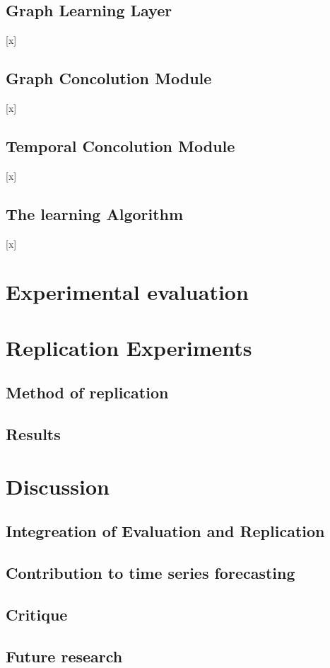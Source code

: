 \documentclass[letterpaper,twocolumn,11pt]{article}
\begin{document}
\subsection{Graph Learning Layer}
[x]
\subsection{Graph Concolution Module}
[x]
\subsection{Temporal Concolution Module}
[x]
\subsection{The learning Algorithm}
[x]
\section{Experimental evaluation}

\section{Replication Experiments}

\subsection{Method of replication}

\subsection{Results}

\section{Discussion}
\subsection{Integreation of Evaluation and Replication}
\subsection{Contribution to time series forecasting}
\subsection{Critique}
\subsection{Future research}

{\footnotesize 
}


\theendnotes
\end{document}
